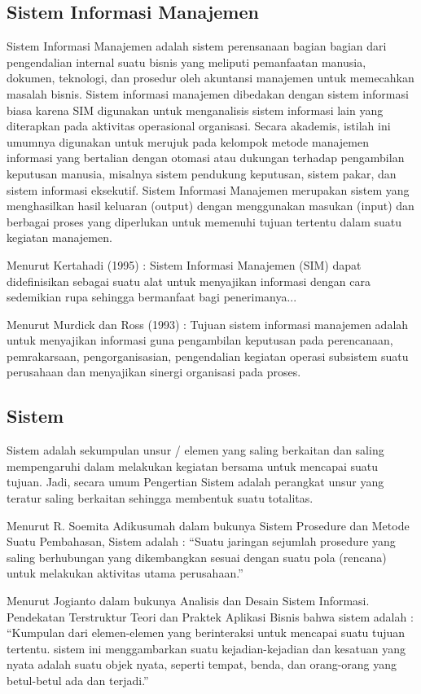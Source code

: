 \documentclass{jtetiproposalskripsi}
\begin{document}
\subsection{Sistem Informasi Manajemen }
Sistem Informasi Manajemen adalah sistem perensanaan bagian bagian dari pengendalian internal suatu bisnis yang meliputi pemanfaatan manusia, dokumen, teknologi, dan prosedur oleh akuntansi manajemen untuk memecahkan masalah bisnis. Sistem informasi manajemen dibedakan dengan sistem informasi biasa karena SIM digunakan untuk menganalisis sistem informasi lain yang diterapkan pada aktivitas operasional organisasi. Secara akademis, istilah ini umumnya digunakan untuk merujuk pada kelompok metode manajemen informasi yang bertalian dengan otomasi atau dukungan terhadap pengambilan keputusan manusia, misalnya sistem pendukung keputusan, sistem pakar, dan sistem informasi eksekutif. Sistem Informasi Manajemen merupakan sistem yang menghasilkan hasil keluaran (output) dengan menggunakan masukan (input) dan berbagai proses yang diperlukan untuk memenuhi tujuan tertentu dalam suatu kegiatan manajemen.

Menurut Kertahadi (1995) : Sistem Informasi Manajemen (SIM) dapat didefinisikan sebagai suatu alat untuk menyajikan informasi dengan cara sedemikian rupa sehingga bermanfaat bagi penerimanya...
	
Menurut Murdick dan Ross  (1993) : Tujuan sistem informasi manajemen adalah untuk menyajikan informasi guna pengambilan keputusan pada perencanaan, pemrakarsaan, pengorganisasian, pengendalian kegiatan operasi subsistem suatu perusahaan dan menyajikan sinergi organisasi pada proses.

\subsection{Sistem}
Sistem adalah sekumpulan unsur / elemen yang saling berkaitan dan saling mempengaruhi dalam melakukan kegiatan bersama untuk mencapai suatu tujuan. Jadi, secara umum Pengertian Sistem adalah perangkat unsur yang teratur saling berkaitan sehingga membentuk suatu totalitas.

Menurut R. Soemita Adikusumah dalam bukunya Sistem Prosedure dan Metode Suatu Pembahasan, Sistem adalah : “Suatu jaringan sejumlah prosedure yang saling berhubungan yang dikembangkan sesuai dengan suatu pola (rencana) untuk melakukan aktivitas utama perusahaan.”

Menurut Jogianto dalam bukunya Analisis dan Desain Sistem Informasi. Pendekatan Terstruktur Teori dan Praktek Aplikasi Bisnis bahwa sistem adalah : “Kumpulan dari elemen-elemen yang berinteraksi untuk mencapai suatu tujuan tertentu. sistem ini menggambarkan suatu kejadian-kejadian dan kesatuan yang nyata adalah suatu objek nyata, seperti tempat, benda, dan orang-orang yang betul-betul ada dan terjadi.”
\end{document}
